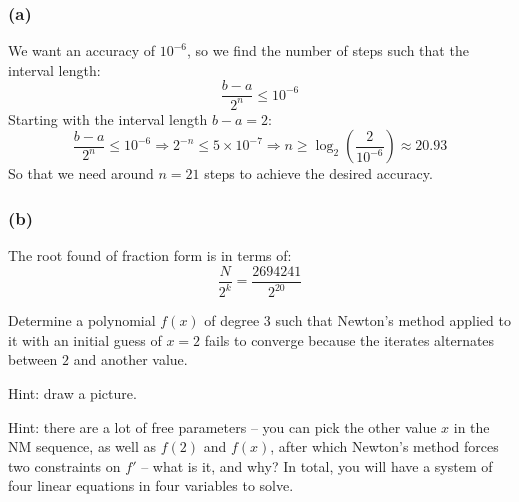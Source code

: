 \documentclass{article}
\begin{document}
\subsubsection*{(a)}
We want an accuracy of $10^{-6}$, so we find the number of steps such that the interval length:
\[ \frac{b - a}{2^n} \leq 10^{-6} \]
Starting with the interval length $b - a = 2$:
\[ \frac{b - a}{2^n} \leq 10^{-6} \Rightarrow 2^{-n} \leq 5 \times 10^{-7} \Rightarrow n \geq \log_{2} \left( \frac{2}{10^{-6}} \right) \approx 20.93 \]
So that we need around $n = 21$ steps to achieve the desired accuracy.

\subsubsection*{(b)}
The root found of fraction form is in terms of:
\[ \frac{N}{2^k} = \frac{2694241}{2^{20}} \]

\newpage

\begin{problem}
    Determine a polynomial \(f(x)\) of degree \(3\) such that Newton's method applied to it with an initial guess of \(x=2\) fails to converge because the iterates alternates between \(2\) and another value.
    
    Hint: draw a picture.
    
    Hint: there are a lot of free parameters -- you can pick the other value \(x\) in the NM sequence, as well as \(f(2)\) and \(f(x)\), after which Newton's method forces two constraints on \(f'\) -- what is it, and why? In total, you will have a system of four linear equations in four variables to solve.
\end{problem}
\end{document}
